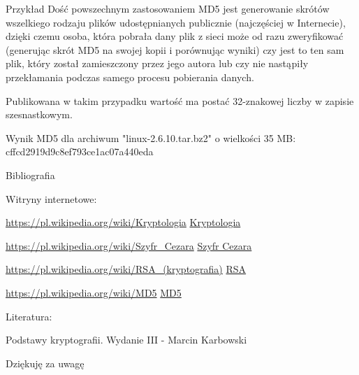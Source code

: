 \documentclass[10pt]{beamer}
\begin{document}
\begin{frame}{Przykład}
  	Dość powszechnym zastosowaniem MD5 jest generowanie skrótów wszelkiego rodzaju plików udostępnianych publicznie (najczęściej w Internecie), dzięki czemu osoba, która pobrała dany plik z sieci może od razu zweryfikować (generując skrót MD5 na swojej kopii i porównując wyniki) czy jest to ten sam plik, który został zamieszczony przez jego autora lub czy nie nastąpiły przekłamania podczas samego procesu pobierania danych.
  	
  	 Publikowana w takim przypadku wartość ma postać 32-znakowej liczby w zapisie szesnastkowym.

	\begin{block}{Wynik MD5 dla archiwum "linux-2.6.10.tar.bz2" o wielkości 35 MB: cffcd2919d9c8ef793ce1ac07a440eda}
    \end{block}

\end{frame}

\begin{frame}{Bibliografia}

Witryny internetowe:

\url{https://pl.wikipedia.org/wiki/Kryptologia}
\href{https://pl.wikipedia.org/wiki/Kryptologia}{Kryptologia}

\url{https://pl.wikipedia.org/wiki/Szyfr_Cezara}
\href{https://pl.wikipedia.org/wiki/Szyfr_Cezara}{Szyfr Cezara}

\url{https://pl.wikipedia.org/wiki/RSA_(kryptografia)}
\href{https://pl.wikipedia.org/wiki/RSA_(kryptografia)}{RSA}

\url{https://pl.wikipedia.org/wiki/MD5}
\href{https://pl.wikipedia.org/wiki/MD5}{MD5}

Literatura:

Podstawy kryptografii. Wydanie III - Marcin Karbowski

\end{frame}

\begin{frame}[standout]
	Dziękuję za uwagę
\end{frame}

\appendix
\end{document}
